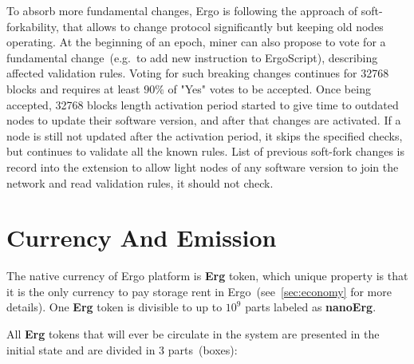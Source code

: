 \documentclass[]{article}
\newcommand{\Ergo}{Ergo}
\newcommand{\Erg}{\textbf{Erg}}
\newcommand{\nanoErg}{\textbf{nanoErg}}
\begin{document}
    To absorb more fundamental changes, Ergo is following the approach of soft-forkability, that
    allows to change protocol significantly but keeping old nodes operating.
    At the beginning of an epoch, miner can also propose to vote for a fundamental change~(e.g.~to
    add new instruction to ErgoScript), describing affected validation rules.
    Voting for such breaking changes continues for 32768 blocks and requires at least $90\%$ of
    "Yes" votes to be accepted.
    Once being accepted, 32768 blocks length activation period started to give time to outdated
    nodes to update their software version, and after that changes are activated.
    If a node is still not updated after the activation period, it skips the specified checks,
    but continues to validate all the known rules.
    List of previous soft-fork changes is record into the extension to allow light nodes of
    any software version to join the network and read validation rules, it should not check.





    \section{Currency And Emission}
    \label{sec:currency}


    The native currency of \Ergo{} platform is \Erg{} token, which unique property is
    that it is the only currency to pay storage rent in \Ergo{}~(see~\ref{sec:economy} for more details).
    One \Erg{} token is divisible to up to $10^9$ parts labeled as \nanoErg{}.

    All \Erg{} tokens that will ever be circulate in the system are presented in the
    initial state and are divided in 3 parts~(boxes):
\end{document}
